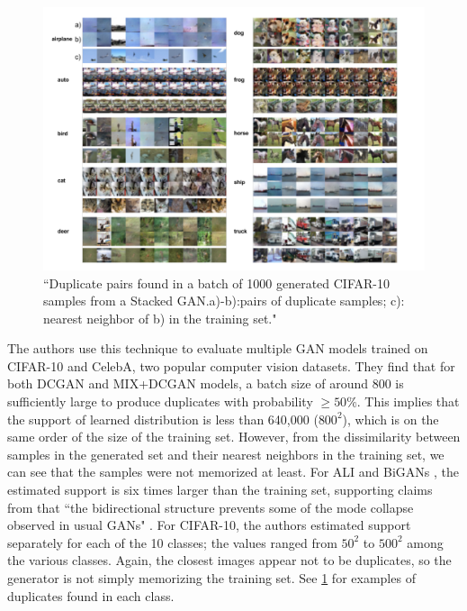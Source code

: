 \begin{figure}[t]
    \centering
    \includegraphics[width=1.0\linewidth]{chapter_14/files/cifar10dup.png}
    \caption{``Duplicate pairs found in a batch of 1000 generated CIFAR-10 samples from a Stacked GAN.a)-b):pairs of duplicate samples; c): nearest neighbor of b) in the training set." \cite{arora2018do}}
    \label{fig:cifar10dup}
\end{figure}

The authors use this technique to evaluate multiple GAN models trained on CIFAR-10 and CelebA, two popular computer vision datasets. They find that for both DCGAN \cite{goodfellow2014generative, radford2015unsupervised} and MIX+DCGAN \cite{Ma_2018} models, a batch size of around 800 is sufficiently large to produce duplicates with probability $\geq 50\%$. This implies that the support of learned distribution is less than 640,000 ($800^2$), which is on the same order of the size of the training set. However, from the dissimilarity between samples in the generated set and their nearest neighbors in the training set, we can see that the samples were not memorized at least. For ALI \cite{dumoulin2016adversarially} and BiGANs \cite{donahue2016adversarial}, the estimated support is six times larger than the training set, supporting claims from \cite{dumoulin2016adversarially, donahue2016adversarial} that ``the bidirectional structure prevents some of the mode collapse observed in usual GANs" \cite{arora2018do}. For CIFAR-10, the authors estimated support separately for each of the 10 classes; the values ranged from $50^2$ to $500^2$ among the various classes. Again, the closest images appear not to be duplicates, so the generator is not simply memorizing the training set. See \ref{fig:cifar10dup} for examples of duplicates found in each class.

